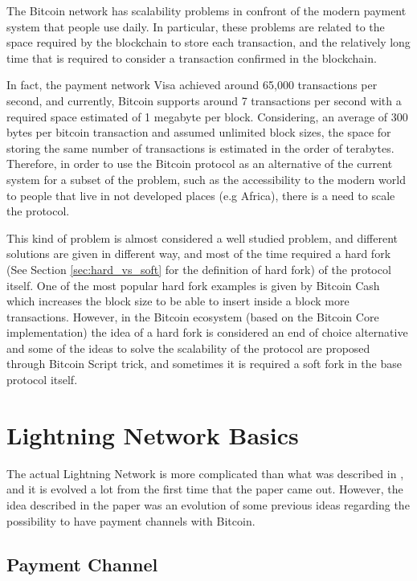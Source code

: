 The Bitcoin network has scalability problems in confront of the modern payment system that people use daily.
In particular, these problems are related to the space required by the blockchain to store each transaction,
and the relatively long time that is required to consider a transaction confirmed in the blockchain.

In fact, the payment network Visa achieved around 65,000\cite{visa-sheet} transactions per second, and currently,
Bitcoin supports around 7 transactions per second with a required space estimated of 1 megabyte per block. Considering,
an average of 300 bytes per bitcoin transaction and assumed unlimited block sizes, the space for storing the same number
of transactions is estimated in the order of terabytes\cite{lightning-network-paper}. Therefore, in order to use the Bitcoin
protocol as an alternative of the current system for a subset of the problem, such as the accessibility to the modern world
to people that live in not developed places (e.g Africa), there is a need to scale the protocol.

This kind of problem is almost considered a well studied problem, and different solutions are given in different
way, and most of the time required a hard fork (See Section \ref{sec:hard_vs_soft} for the definition of hard fork) of the protocol itself.
One of the most popular hard fork examples is given by Bitcoin Cash which increases the block size to be able to insert
inside a block more transactions.
However, in the Bitcoin ecosystem (based on the Bitcoin Core implementation) the idea of a hard fork is considered an
end of choice alternative and some of the ideas to solve the scalability of the protocol are proposed through Bitcoin Script trick,
and sometimes it is required a soft fork in the base protocol itself.

\section{Lightning Network Basics}

The actual Lightning Network is more complicated than what was described in \cite{lightning-network-paper}, and it is
evolved a lot from the first time that the paper came out. However, the idea described in the paper was an evolution
of some previous ideas regarding the possibility to have payment channels with Bitcoin.

\subsection{Payment Channel}

